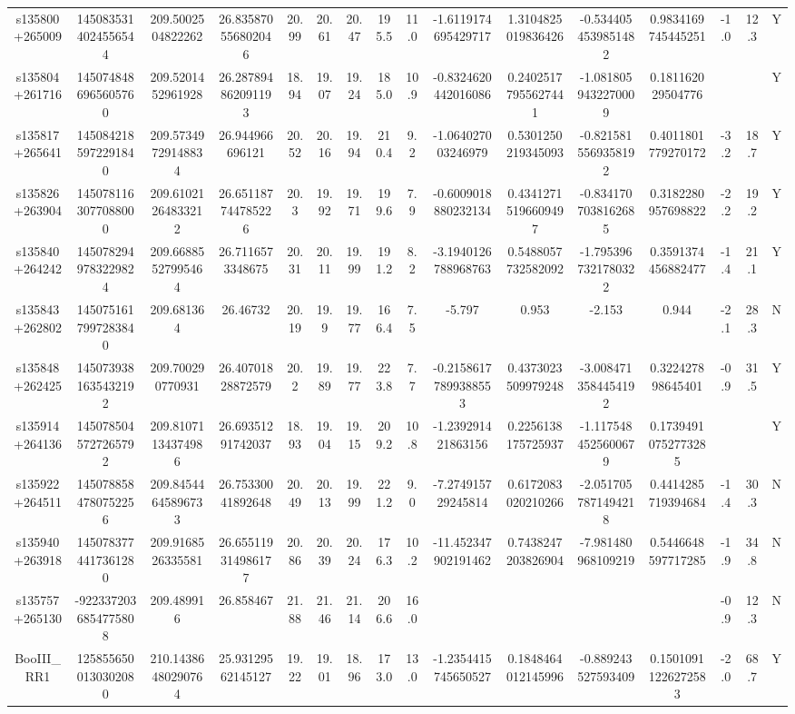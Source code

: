 \begin{table}
\begin{tabular}{cccccccccccccccc}
s135800+265009 & 1450835314024556544 & 209.5002504822262 & 26.835870556802046 & 20.99 & 20.61 & 20.47 & 195.5 & 11.0 & -1.6119174695429717 & 1.3104825019836426 & -0.5344054539851482 & 0.9834169745445251 & -1.0 & 12.3 & Y \\
s135804+261716 & 1450748486965605760 & 209.5201452961928 & 26.287894862091193 & 18.94 & 19.07 & 19.24 & 185.0 & 10.9 & -0.8324620442016086 & 0.24025177955627441 & -1.0818059432270009 & 0.181162029504776 &  &  & Y \\
s135817+265641 & 1450842185972291840 & 209.57349729148834 & 26.944966696121 & 20.52 & 20.16 & 19.94 & 210.4 & 9.2 & -1.064027003246979 & 0.5301250219345093 & -0.8215815569358192 & 0.4011801779270172 & -3.2 & 18.7 & Y \\
s135826+263904 & 1450781163077088000 & 209.61021264833212 & 26.651187744785226 & 20.3 & 19.92 & 19.71 & 199.6 & 7.9 & -0.6009018880232134 & 0.43412715196609497 & -0.8341707038162685 & 0.3182280957698822 & -2.2 & 19.2 & Y \\
s135840+264242 & 1450782949783229824 & 209.66885527995464 & 26.7116573348675 & 20.31 & 20.11 & 19.99 & 191.2 & 8.2 & -3.1940126788968763 & 0.5488057732582092 & -1.7953967321780322 & 0.3591374456882477 & -1.4 & 21.1 & Y \\
s135843+262802 & 1450751617997283840 & 209.681364 & 26.46732 & 20.19 & 19.9 & 19.77 & 166.4 & 7.5 & -5.797 & 0.953 & -2.153 & 0.944 & -2.1 & 28.3 & N \\
s135848+262425 & 1450739381635432192 & 209.700290770931 & 26.40701828872579 & 20.2 & 19.89 & 19.77 & 223.8 & 7.7 & -0.21586177899388553 & 0.4373023509979248 & -3.0084713584454192 & 0.322427898645401 & -0.9 & 31.5 & Y \\
s135914+264136 & 1450785045727265792 & 209.81071134374986 & 26.69351291742037 & 18.93 & 19.04 & 19.15 & 209.2 & 10.8 & -1.239291421863156 & 0.2256138175725937 & -1.1175484525600679 & 0.17394910752773285 &  &  & Y \\
s135922+264511 & 1450788584780752256 & 209.84544645896733 & 26.75330041892648 & 20.49 & 20.13 & 19.99 & 221.2 & 9.0 & -7.274915729245814 & 0.6172083020210266 & -2.0517057871494218 & 0.4414285719394684 & -1.4 & 30.3 & N \\
s135940+263918 & 1450783774417361280 & 209.9168526335581 & 26.655119314986177 & 20.86 & 20.39 & 20.24 & 176.3 & 10.2 & -11.452347902191462 & 0.7438247203826904 & -7.981480968109219 & 0.5446648597717285 & -1.9 & 34.8 & N \\
s135757+265130 & -9223372036854775808 & 209.489916 & 26.858467 & 21.88 & 21.46 & 21.14 & 206.6 & 16.0 &  &  &  &  & -0.9 & 12.3 & N \\
BooIII_RR1 & 1258556500130302080 & 210.14386480290764 & 25.93129562145127 & 19.22 & 19.01 & 18.96 & 173.0 & 13.0 & -1.2354415745650527 & 0.1848464012145996 & -0.889243527593409 & 0.15010911226272583 & -2.0 & 68.7 & Y \\
\end{tabular}
\end{table}

